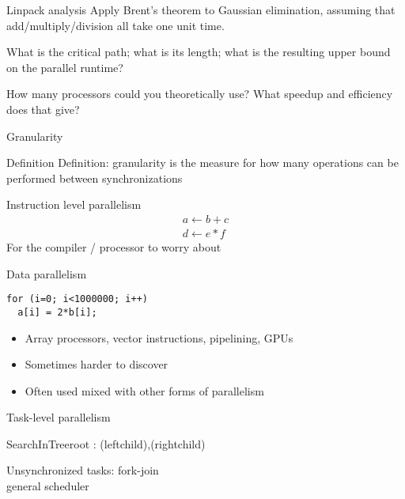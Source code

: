 \begin{exercise}{Linpack analysis}
  Apply Brent's theorem to Gaussian elimination,
  assuming that add/multiply/division all take one unit time.

  What is the critical path; what is its length; what is the resulting upper bound
  on the parallel runtime?
  
  How many processors could you theoretically use?
  What speedup and efficiency does that give?
\end{exercise}

 {Granularity}

\begin{numberedframe}{Definition}
  Definition: granularity is the measure for how many 
  operations can be performed between synchronizations
\end{numberedframe}

\begin{numberedframe}{Instruction level parallelism}
\[ 
\begin{array}{l}
  a\leftarrow b+c\\ d\leftarrow e*f
\end{array}
\]
For the compiler / processor to worry about
\end{numberedframe}

\begin{numberedframe}{Data parallelism}
\begin{lstlisting}
for (i=0; i<1000000; i++)
  a[i] = 2*b[i];
\end{lstlisting}
\begin{itemize}
\item Array processors, vector instructions, pipelining, GPUs
\item Sometimes harder to discover
\item Often used mixed with other forms of parallelism
\end{itemize}
\end{numberedframe}

\begin{numberedframe}{Task-level parallelism}
  \begin{displayprocedure}{SearchInTree}{root}
  {\parl: \search(leftchild),\search(rightchild)}
\end{displayprocedure}

Unsynchronized tasks: fork-join\\
general scheduler

\begin{displayalgorithm}
\end{displayalgorithm}
\end{numberedframe}

